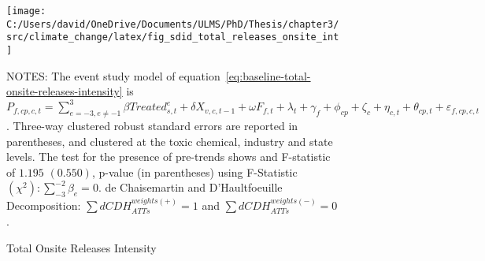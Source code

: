 \begin{figure}[H]
    \centering
    \texttt{[image: C:/Users/david/OneDrive/Documents/ULMS/PhD/Thesis/chapter3/src/climate\_change/latex/fig\_sdid\_total\_releases\_onsite\_int]}
    \caption{Total Onsite Releases Intensity}
    \label{fig:baseline-total-onsite-releases-intensity}
    \begin{minipage}{\columnwidth}
        \vspace{0.05in}
        \tiny NOTES: The event study model of equation~\ref{eq:baseline-total-onsite-releases-intensity} is $P_{f,cp,c,t} = \sum_{{e = -3},{e \neq -1}}^{3} \beta Treated_{s,t}^e + \delta X_{v,c,t-1} + \omega F_{f,t} + \lambda_{t} + \gamma_{f} + \phi_{cp} + \zeta_{c} + \eta_{c,t} + \theta_{cp,t} + \varepsilon_{f,cp,c,t}$. Three-way clustered robust standard errors are reported in parentheses, and clustered at the toxic chemical, industry and state levels. The test for the presence of pre-trends shows and F-statistic of $1.195$ $(0.550)$, p-value (in parentheses) using F-Statistic $(\chi^2): \sum_{-3}^{-2} \beta_{e} = 0$. de Chaisemartin and D'Haultfoeuille Decomposition: $\sum dCDH_{ATTs}^{weights(+)} = 1$ and $\sum dCDH_{ATTs}^{weights(-)} = 0$.
    \end{minipage}
\end{figure}